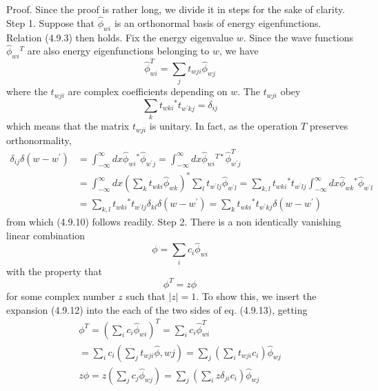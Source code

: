 \documentclass{article}
\begin{document}
Proof. Since the proof is rather long, we divide it in steps for the sake of clarity.
Step 1. Suppose that $\hat{\phi}_{w i}$ is an orthonormal basis of energy eigenfunctions. Relation (4.9.3) then holds. Fix the energy eigenvalue $w$. Since the wave functions $\hat{\phi}_{w i}{ }^{T}$ are also energy eigenfunctions belonging to $w$, we have
$$
\begin{equation*}
\hat{\phi}_{w i}^{T}=\sum_{j} t_{w j i} \hat{\phi}_{w j} \tag{4.9.9}
\end{equation*}
$$
where the $t_{w j i}$ are complex coefficients depending on $w$. The $t_{w j i}$ obey
$$
\begin{equation*}
\sum_{k} t_{w k i}{ }^{*} t_{w^{\prime} k j}=\delta_{i j} \tag{4.9.10}
\end{equation*}
$$
which means that the matrix $t_{w j i}$ is unitary. In fact, as the operation $T$ preserves orthonormality,
$$
\begin{align*}
\delta_{i j} \delta\left(w-w^{\prime}\right) & =\int_{-\infty}^{\infty} d x \hat{\phi}_{w i}{ }^{*} \hat{\phi}_{w^{\prime} j}=\int_{-\infty}^{\infty} d x \hat{\phi}_{w i}{ }^{T *} \hat{\phi}_{w^{\prime} j}^{T}  \tag{4.9.11}\\
& =\int_{-\infty}^{\infty} d x\left(\sum_{k} t_{w k i} \hat{\phi}_{w k}\right)^{*} \sum_{l} t_{w^{\prime} l j} \hat{\phi}_{w^{\prime} l}=\sum_{k, l} t_{w k i}{ }^{*} t_{w^{\prime} l j} \int_{-\infty}^{\infty} d x \hat{\phi}_{w k}{ }^{*} \hat{\phi}_{w^{\prime} l} \\
& =\sum_{k, l} t_{w k i}{ }^{*} t_{w^{\prime} l j} \delta_{k l} \delta\left(w-w^{\prime}\right)=\sum_{k} t_{w k i}{ }^{*} t_{w^{\prime} k j} \delta\left(w-w^{\prime}\right)
\end{align*}
$$
from which (4.9.10) follows readily.
Step 2. There is a non identically vanishing linear combination
$$
\begin{equation*}
\phi=\sum_{i} c_{i} \hat{\phi}_{w i} \tag{4.9.12}
\end{equation*}
$$
with the property that
$$
\begin{equation*}
\phi^{T}=z \phi \tag{4.9.13}
\end{equation*}
$$
for some complex number $z$ such that $|z|=1$. To show this, we insert the expansion (4.9.12) into the each of the two sides of eq. (4.9.13), getting
$$
\begin{gather*}
\phi^{T}=\left(\sum_{i} c_{i} \hat{\phi}_{w i}\right)^{T}=\sum_{i} c_{i} \hat{\phi}_{w i}^{T}  \tag{4.9.14}\\
=\sum_{i} c_{i}\left(\sum_{j} t_{w j i} \hat{\phi}, w j\right)=\sum_{j}\left(\sum_{i} t_{w j i} c_{i}\right) \hat{\phi}_{w j} \\
z \phi=z\left(\sum_{j} c_{j} \hat{\phi}_{w j}\right)=\sum_{j}\left(\sum_{i} z \delta_{j i} c_{i}\right) \hat{\phi}_{w j} \tag{4.9.15}
\end{gather*}
$$
\end{document}
